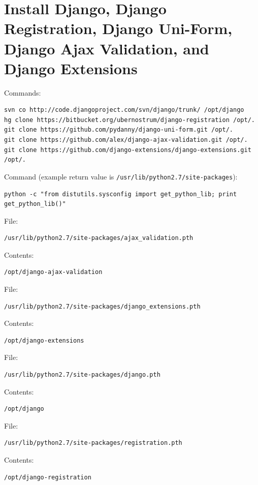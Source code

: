 \documentclass{article}
\begin{document}
\section{Install Django, Django Registration, Django Uni-Form, Django Ajax Validation, and Django Extensions}

Commands:
\begin{verbatim}
svn co http://code.djangoproject.com/svn/django/trunk/ /opt/django
hg clone https://bitbucket.org/ubernostrum/django-registration /opt/.
git clone https://github.com/pydanny/django-uni-form.git /opt/.
git clone https://github.com/alex/django-ajax-validation.git /opt/.
git clone https://github.com/django-extensions/django-extensions.git /opt/.
\end{verbatim}

Command (example return value is \verb#/usr/lib/python2.7/site-packages#):
\begin{verbatim}
python -c "from distutils.sysconfig import get_python_lib; print get_python_lib()"
\end{verbatim}

File:
\begin{verbatim}
/usr/lib/python2.7/site-packages/ajax_validation.pth
\end{verbatim}

Contents:
\begin{verbatim}
/opt/django-ajax-validation
\end{verbatim}

File:
\begin{verbatim}
/usr/lib/python2.7/site-packages/django_extensions.pth
\end{verbatim}

Contents:
\begin{verbatim}
/opt/django-extensions
\end{verbatim}

File:
\begin{verbatim}
/usr/lib/python2.7/site-packages/django.pth
\end{verbatim}

Contents:
\begin{verbatim}
/opt/django
\end{verbatim}

File:
\begin{verbatim}
/usr/lib/python2.7/site-packages/registration.pth
\end{verbatim}

Contents:
\begin{verbatim}
/opt/django-registration
\end{verbatim}
\end{document}
